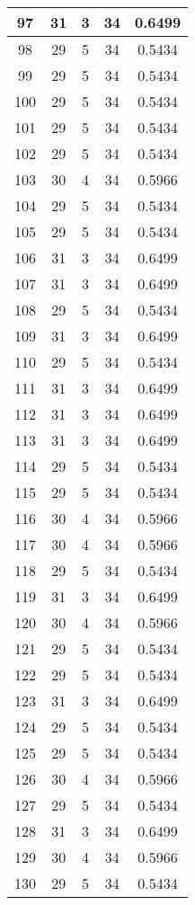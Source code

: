 \documentclass[letterpaper, 12pt]{article}
\begin{document}
\begin{longtable}{|c|c|c|c|c|}
\hline
97 & 31 & 3 & 34 & 0.6499 \\
\hline
98 & 29 & 5 & 34 & 0.5434 \\
\hline
99 & 29 & 5 & 34 & 0.5434 \\
\hline
100 & 29 & 5 & 34 & 0.5434 \\
\hline
101 & 29 & 5 & 34 & 0.5434 \\
\hline
102 & 29 & 5 & 34 & 0.5434 \\
\hline
103 & 30 & 4 & 34 & 0.5966 \\
\hline
104 & 29 & 5 & 34 & 0.5434 \\
\hline
105 & 29 & 5 & 34 & 0.5434 \\
\hline
106 & 31 & 3 & 34 & 0.6499 \\
\hline
107 & 31 & 3 & 34 & 0.6499 \\
\hline
108 & 29 & 5 & 34 & 0.5434 \\
\hline
109 & 31 & 3 & 34 & 0.6499 \\
\hline
110 & 29 & 5 & 34 & 0.5434 \\
\hline
111 & 31 & 3 & 34 & 0.6499 \\
\hline
112 & 31 & 3 & 34 & 0.6499 \\
\hline
113 & 31 & 3 & 34 & 0.6499 \\
\hline
114 & 29 & 5 & 34 & 0.5434 \\
\hline
115 & 29 & 5 & 34 & 0.5434 \\
\hline
116 & 30 & 4 & 34 & 0.5966 \\
\hline
117 & 30 & 4 & 34 & 0.5966 \\
\hline
118 & 29 & 5 & 34 & 0.5434 \\
\hline
119 & 31 & 3 & 34 & 0.6499 \\
\hline
120 & 30 & 4 & 34 & 0.5966 \\
\hline
121 & 29 & 5 & 34 & 0.5434 \\
\hline
122 & 29 & 5 & 34 & 0.5434 \\
\hline
123 & 31 & 3 & 34 & 0.6499 \\
\hline
124 & 29 & 5 & 34 & 0.5434 \\
\hline
125 & 29 & 5 & 34 & 0.5434 \\
\hline
126 & 30 & 4 & 34 & 0.5966 \\
\hline
127 & 29 & 5 & 34 & 0.5434 \\
\hline
128 & 31 & 3 & 34 & 0.6499 \\
\hline
129 & 30 & 4 & 34 & 0.5966 \\
\hline
130 & 29 & 5 & 34 & 0.5434 \\

\end{longtable}
\end{document}
